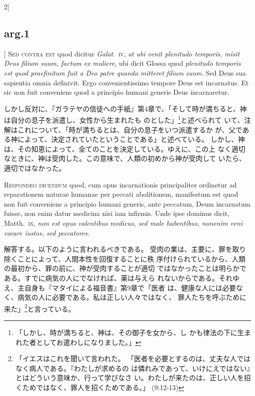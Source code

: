 \documentclass[paper=a4paper,fontsize=10pt,jafontsize=9pt,titlepage]{jlreq}
\begin{document}
\begin{paracol}{2}[\subsection{arg.1}]
{\scshape Sed contra est} quod dicitur {\itshape Galat}.~{\scshape iv}, {\itshape at
ubi venit plenitudo temporis, misit Deus filium suum, factum ex muliere},
ubi dicit Glossa quod {\itshape plenitudo temporis est quod praefinitum fuit a Deo
patre quando mitteret filium suum}. Sed Deus sua sapientia omnia
definivit. Ergo convenientissimo tempore Deus est incarnatus. Et sic non
fuit conveniens quod a principio humani generis Deus incarnaretur.

\switchcolumn

しかし反対に、『ガラテヤの信徒への手紙』第4章で、「そして時が満ちると、神は自分の息子を派遣し、女性から生まれたも
 のとした」\footnote{「しかし、時が満ちると、神は、その御子を女から、し
 かも律法の下に生まれた者としてお遣わしになりました。」 }と述べられて
 いて、注解はこれについて、「時が満ちるとは、自分の息子をいつ派遣するか
 が、父である神によって、決定されていたということである」と述べている。
しかし、神は、その知恵によって、全てのことを決定している。ゆえに、この上
 なく適切なときに、神は受肉した。この意味で、人類の初めから神が受肉して
 いたら、適切ではなかった。


{\scshape Respondeo dicendum} quod, cum opus
incarnationis principaliter ordinetur ad reparationem naturae humanae
per peccati abolitionem, manifestum est quod non fuit conveniens a
principio humani generis, ante peccatum, Deum incarnatum fuisse, non
enim datur medicina nisi iam infirmis. Unde ipse dominus dicit,
Matth.~{\scshape ix}, {\itshape non est opus valentibus medicus, sed male habentibus, nonenim veni vocare iustos, sed peccatores}.

\switchcolumn

解答する。以下のように言われるべきである。
受肉の業は、主要に、罪を取り除くことによって、人間本性を回復することに秩
 序付けられているから、人類の最初から、罪の前に、神が受肉することが適切
 ではなかったことは明らかである。すでに病気の人にでなければ、薬は与えら
 れないからである。それゆえ、主自身も『マタイによる福音書』第9章で「医者
 は、健康な人には必要なく、病気の人に必要である。私は正しい人々ではなく、
 罪人たちを呼ぶために来た」\footnote{「イエスはこれを聞いて言われた。
 「医者を必要とするのは、丈夫な人ではなく病人である。『わたしが求めるの
 は憐れみであって、いけにえではない』とはどういう意味か、行って学びなさ
 い。わたしが来たのは、正しい人を招くためではなく、罪人を招くためである。」
 (9:12-13)}と言っている。


\end{paracol}
\end{document}
